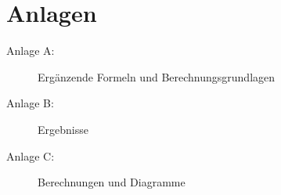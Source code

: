 \cleardoublepage
\appendix
{}
\chapter*{Anlagen}

\begin{description}
\item[Anlage A:] Ergänzende Formeln und Berechnungsgrundlagen\hfill \\
\item[Anlage B:] Ergebnisse \hfill \\
\item[Anlage C:] Berechnungen und Diagramme\hfill \\
\end{description}
